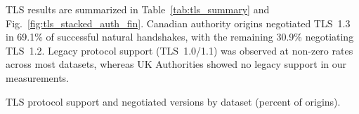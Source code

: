 \documentclass[conference]{IEEEtran}
\begin{document}
TLS results are summarized in Table~\ref{tab:tls_summary} and Fig.~\ref{fig:tls_stacked_auth_fin}. Canadian authority origins negotiated TLS~1.3 in 69.1\% of successful natural handshakes, with the remaining 30.9\% negotiating TLS~1.2. 
Legacy protocol support (TLS~1.0/1.1) was observed at non-zero rates across most datasets, whereas UK Authorities showed no legacy support in our measurements. 

\begin{table}[t]
  \caption{TLS protocol support and negotiated versions by dataset (percent of origins).}
  \label{tab:tls_summary}
  \centering
  \scriptsize
  \setlength{\tabcolsep}{3pt}
  \renewcommand{\arraystretch}{1.15}
  
  \begin{adjustbox}{max width=\columnwidth}
  \end{adjustbox}
\end{table}
\end{document}
